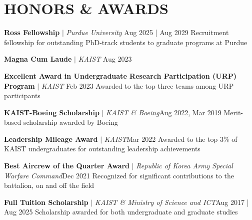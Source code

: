 \section{HONORS \& AWARDS}
\resumeSubHeadingListStart
    \resumeProjecttwoHeading
    {\textbf{Ross Fellowship} $|$ \emph{Purdue University}}    {Aug 2025 | Aug 2029}
    {Recruitment fellowship for outstanding PhD-track students to graduate programs at Purdue}{}

    \resumeProjecttwoHeading
    {\textbf{Magna Cum Laude} $|$ \emph{KAIST}}    {Aug 2023}
    {}{}

    \resumeProjectHeading
    {\textbf{Excellent Award in Undergraduate Research Participation (URP) Program} $|$ \emph{KAIST}}    {Feb 2023}
    {Awarded to the top three teams among URP participants}{}
    
    \resumeProjectHeading
    {\textbf{KAIST-Boeing Scholarship} $|$ \emph{KAIST \& Boeing}}{Aug 2022, Mar 2019}
    {Merit-based scholarship awarded by Boeing}{}
    
    \resumeProjectHeading
    {\textbf{Leadership Mileage Award} $|$ \emph{KAIST}}{Mar 2022}
    {Awarded to the top 3\% of KAIST undergraduates for outstanding leadership achievements}{}

    \resumeProjectHeading
    {\textbf{Best Aircrew of the Quarter Award} $|$ \emph{Republic of Korea Army Special Warfare Command}}{Dec 2021}
    {Recognized for significant contributions to the battalion, on and off the field}{}

   \resumeProjectHeading
    {\textbf{Full Tuition Scholarship} $|$ \emph{KAIST \& Ministry of Science and ICT}}{Aug 2017 | Aug 2025}
    {Scholarship awarded for both undergraduate and graduate studies}{}

\resumeSubHeadingListEnd